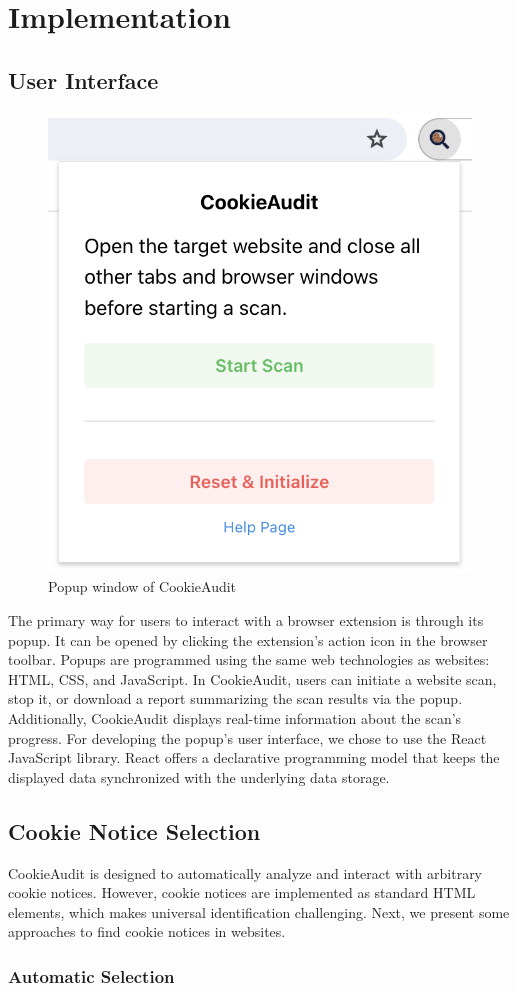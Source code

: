 \chapter{Implementation}

\section{User Interface}
\begin{figure}
	\centering
	\includegraphics[width=0.5\linewidth]{screenshot_popup.png}
	\caption{Popup window of CookieAudit}
	\label{fig:screenshot-popup}
\end{figure}
The primary way for users to interact with a browser extension is through its popup.
It can be opened by clicking the extension's action icon in the browser toolbar.
Popups are programmed using the same web technologies as websites: HTML, CSS, and JavaScript.
In CookieAudit, users can initiate a website scan, stop it, or download a report summarizing the scan results via the popup.
Additionally, CookieAudit displays real-time information about the scan's progress.
For developing the popup's user interface, we chose to use the React JavaScript library.
React offers a declarative programming model that keeps the displayed data synchronized with the underlying data storage.

\section{Cookie Notice Selection}
CookieAudit is designed to automatically analyze and interact with arbitrary cookie notices. 
However, cookie notices are implemented as standard HTML elements, which makes universal identification challenging.
Next, we present some approaches to find cookie notices in websites.

\subsection{Automatic Selection}
